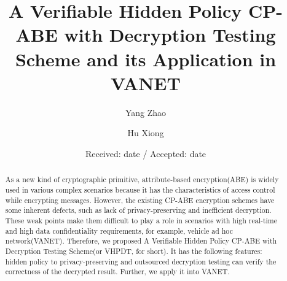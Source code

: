 \documentclass[smallextended]{svjour3}       %
\begin{document}
\title{A Verifiable Hidden Policy CP-ABE with Decryption Testing Scheme and its Application in VANET}


\author{ 
	Yang  Zhao \and %
	Hu Xiong 
}
\clearpage




\date{Received: date / Accepted: date}

\maketitle

\begin{abstract}
	As a new kind of cryptographic primitive, attribute-based encryption(ABE) is widely used in various complex scenarios because it has the characteristics of access control while encrypting messages.
	However, the existing CP-ABE encryption schemes have some inherent defects, such as lack of privacy-preserving and inefficient decryption. 
	These weak points make them difficult to play a role in scenarios with high real-time and high data confidentiality requirements, for example, vehicle ad hoc network(VANET).
	Therefore, we proposed A Verifiable Hidden Policy CP-ABE with Decryption Testing Scheme(or VHPDT, for short).
	It has the following features: hidden policy to privacy-preserving and outsourced decryption testing can verify  the correctness of the decrypted result.
	Further, we apply it into VANET.
\end{abstract}
\end{document}
